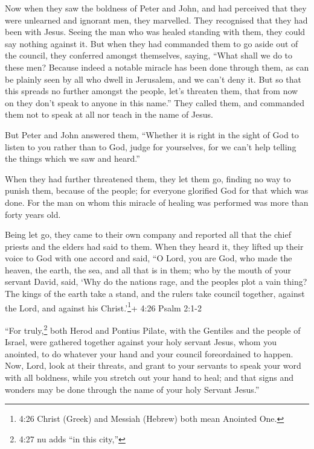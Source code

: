  Now when they saw the boldness of Peter and John, and had
perceived that they were unlearned and ignorant men, they marvelled.
They recognised that they had been with Jesus.  Seeing the
man who was healed standing with them, they could say nothing against
it.  But when they had commanded them to go aside out of
the council, they conferred amongst themselves,  saying,
``What shall we do to these men? Because indeed a notable miracle has
been done through them, as can be plainly seen by all who dwell in
Jerusalem, and we can't deny it.  But so that this spreads
no further amongst the people, let's threaten them, that from now on
they don't speak to anyone in this name.''  They called
them, and commanded them not to speak at all nor teach in the name of
Jesus.

 But Peter and John answered them, ``Whether it is right in
the sight of God to listen to you rather than to God, judge for
yourselves,  for we can't help telling the things which we
saw and heard.''

 When they had further threatened them, they let them go,
finding no way to punish them, because of the people; for everyone
glorified God for that which was done.  For the man on whom
this miracle of healing was performed was more than forty years old.

 Being let go, they came to their own company and reported
all that the chief priests and the elders had said to them.
 When they heard it, they lifted up their voice to God with
one accord and said, ``O Lord, you are God, who made the heaven, the
earth, the sea, and all that is in them;  who by the mouth
of your servant David, said, `Why do the nations rage, and the peoples
plot a vain thing?  The kings of the earth take a stand,
and the rulers take council together, against the Lord, and against his
Christ.'\footnote{4:26 Christ (Greek) and Messiah (Hebrew) both mean
  Anointed One.}+ 4:26 Psalm 2:1-2

 ``For truly,\footnote{4:27 nu adds ``in this city,''} both
Herod and Pontius Pilate, with the Gentiles and the people of Israel,
were gathered together against your holy servant Jesus, whom you
anointed,  to do whatever your hand and your council
foreordained to happen.  Now, Lord, look at their threats,
and grant to your servants to speak your word with all boldness,
 while you stretch out your hand to heal; and that signs
and wonders may be done through the name of your holy Servant Jesus.''

